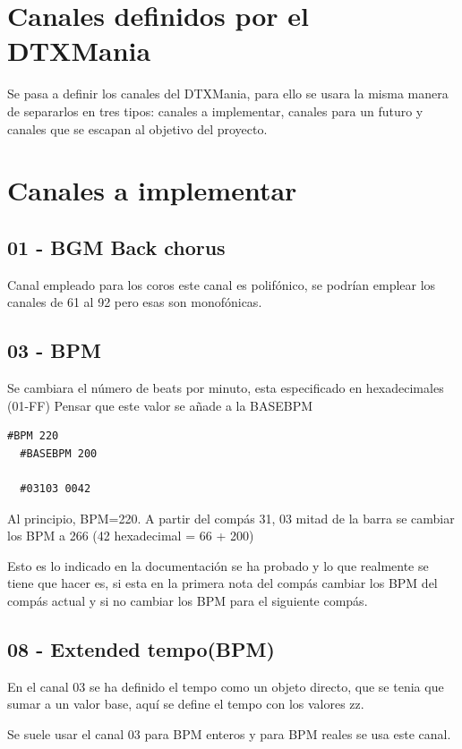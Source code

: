 \documentclass[a4paper,11pt,oneside]{book}
\begin{document}
\section{Canales definidos por el DTXMania}

Se pasa a definir los canales del DTXMania, para ello se usara la misma manera de separarlos en tres tipos: canales a implementar, canales para un futuro y canales que se escapan al objetivo del proyecto.


\section{Canales a implementar}

\subsection{01 - BGM Back chorus}
Canal empleado para los coros este canal es polifónico, se podrían emplear los canales de 61 al 92 pero esas son monofónicas.

\subsection{03 - BPM}
Se cambiara el número de beats por minuto, esta especificado en hexadecimales (01-FF)
Pensar que este valor se añade a la BASEBPM

\begin{Verbatim}[frame=single]
  #BPM 220
  #BASEBPM 200

  #03103 0042
\end{Verbatim}

Al principio, BPM=220.
A partir del compás 31, 03 mitad de la barra se cambiar los BPM a 266 
(42 hexadecimal = 66 + 200)

Esto es lo indicado en la documentación se ha probado y lo que realmente se tiene que hacer es, si esta en la primera nota del compás cambiar los BPM del compás actual y si no cambiar los BPM para el siguiente compás.


\subsection{08 - Extended tempo(BPM)}
En el canal 03 se ha definido el tempo como un objeto directo, que se tenia que sumar a un valor base, aquí se define el tempo con los valores zz.

Se suele usar el canal 03 para BPM enteros y para BPM reales se usa este canal.
\end{document}
